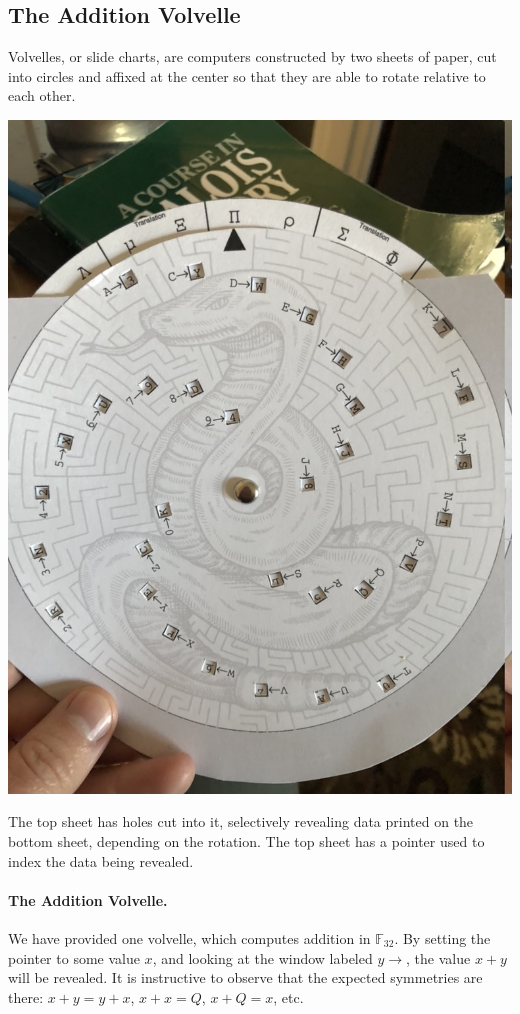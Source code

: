 \documentclass[letterpaper]{article}
\theoremstyle{xxx}
\theoremstyle{evil}
\theoremstyle{yyy}
\theoremstyle{plain}
\theoremstyle{zzz}
\newcommand{\fttwo}{\mathbb{F}_{32}}
\begin{document}
\subsection{The Addition Volvelle}

Volvelles, or slide charts, are computers constructed by two sheets of paper, cut
into circles and affixed at the center so that they are able to rotate relative
to each other.

\begin{center} \includegraphics[scale=0.35]{volvelle.jpeg} \end{center}

The top sheet has holes cut into it, selectively revealing data printed on the
bottom sheet, depending on the rotation. The top sheet has a pointer used to
index the data being revealed.

\paragraph{The Addition Volvelle.} We have provided one volvelle, which computes
addition in $\fttwo$. By setting the pointer to some value $x$, and looking at
the window labeled $y\to$, the value $x+y$ will be revealed. It is instructive
to observe that the expected symmetries are there: $x+y=y+x$, $x+x=Q$, $x+Q=x$,
etc.
\end{document}
